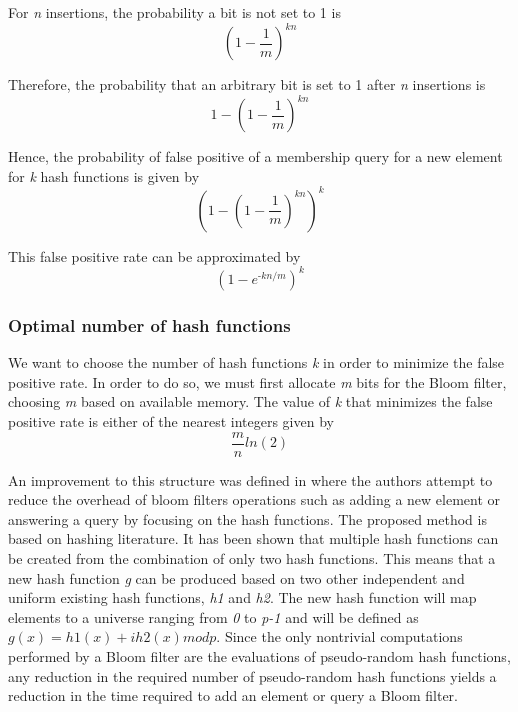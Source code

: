 For \textit{n} insertions, the probability a bit is not set to 1 is
\begin{equation}
    (1-\frac{1}{m})^\textit{kn}
\end{equation}

Therefore, the probability that an arbitrary bit is set to 1 after \textit{n} insertions is 
\begin{equation}
    1-(1-\frac{1}{m})^\textit{kn}
\end{equation}

Hence, the probability of false positive of a membership query for a new element for \textit{k} hash functions is given by
\begin{equation}
    (1-(1-\frac{1}{m})^\textit{kn})^\textit{k}
\end{equation}

This false positive rate can be approximated by 
\begin{equation}
    (1-e^\textit{-kn/m})^\textit{k}
\end{equation}


\subsubsection*{Optimal number of hash functions}
We want to choose the number of hash functions \textit{k} in order to minimize the false positive rate. In order to do so, we must first allocate \textit{m} bits for the Bloom filter, choosing \textit{m} based on available memory. The value of \textit{k} that minimizes the false positive rate is either of the nearest integers given by
\begin{equation}
    \frac{m}{n}ln(2)
\end{equation}

\iffalse
An improvement to this structure was defined in \cite{Kirsch-Better-Bloom} where the authors attempt to reduce the overhead of bloom filters operations such as adding a new element or answering a query by focusing on the hash functions. The proposed method is based on hashing literature. It has been shown that multiple hash functions can be created from the combination of only two hash functions. This means that a new hash function \textit{g} can be produced based on  two other independent and uniform existing hash functions, \textit{h1} and \textit{h2}. The new hash function will map elements to a universe ranging from \textit{0} to \textit{p-1} and will be defined as \textit{$g(x) = h1(x) + ih2(x) mod p$}. Since the only nontrivial computations performed by a Bloom filter are the evaluations of pseudo-random hash functions, any reduction in the required number of pseudo-random hash functions yields a reduction in the time required to add an element or query a Bloom filter.


